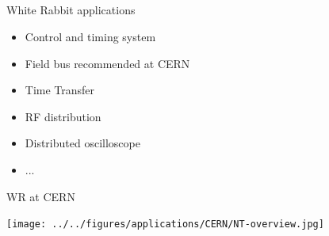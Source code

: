 \documentclass[compress,red]{beamer}
\begin{document}
\subsection{}
\begin{frame}{White Rabbit applications}

  \begin{itemize}
    \item Control and timing system
    \item Field bus recommended at CERN
    \item Time Transfer
    \item RF distribution
    \item Distributed oscilloscope
    \item ...
  \end{itemize}

\end{frame}
\begin{frame}{WR at CERN}

    \begin{center}
      \texttt{[image: ../../figures/applications/CERN/NT-overview.jpg]}
    \end{center}

\end{frame}
\end{document}
